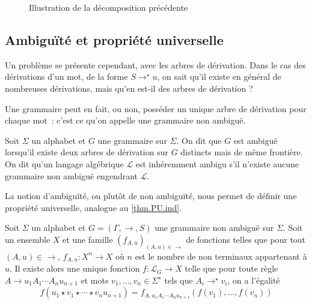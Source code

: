\begin{figure}[ht]
  \centering
  \caption{Illustration de la décomposition précédente}
\end{figure}

\subsection{Ambiguïté et propriété universelle}

Un problème se présente cependant, avec les arbres de dérivation. Dans le cas
des dérivations d'un mot, de la forme $S\to^\star u$, on sait qu'il existe en
général de nombreuses dérivations, mais qu'en est-il des arbres de dérivation ?

Une grammaire peut en fait, ou non, posséder un unique arbre de dérivation pour
chaque mot~: c'est ce qu'on appelle une grammaire non ambiguë.

\begin{definition}[Ambiguïté]
  Soit $\Sigma$ un alphabet et $G$ une grammaire sur $\Sigma$. On dit que $G$
  est ambiguë lorsqu'il existe deux arbres de dérivation sur $G$ distincts mais
  de même frontière. On dit qu'un langage algébrique $\mathcal L$ est
  inhéremment ambigu s'il n'existe aucune grammaire non ambiguë engendrant
  $\mathcal L$.
\end{definition}

La notion d'ambiguïté, ou plutôt de non ambiguïté, nous permet de définir une
propriété universelle, analogue au \cref{thm.PU.ind}.

\begin{proposition}
  \label{prop.PU.gram}
  Soit $\Sigma$ un alphabet et $G=(\Gamma,\to,S)$ une grammaire non ambiguë sur
  $\Sigma$. Soit un ensemble $X$ et une famille $(f_{A,u})_{(A,u) \in \to}$ de
  fonctions telles que pour tout $(A,u) \in \to$, $f_{A,u} : X^n \to X$ où $n$
  est le nombre de non terminaux appartenant à $u$. Il existe alors une unique
  fonction $f : \mathcal L_G \to X$ telle que pour toute règle
  $A \to u_1A_1\cdots A_nu_{n+1}$ et mots $v_1,\ldots,v_n\in\Sigma^\star$ tels que
  $A_i \to^\star v_i$, on a l'égalité
  \[f(u_1\star v_1\star\cdots\star v_n u_{n+1}) =
  f_{A,u_1A_1\cdots A_nu_{n+1}}(f(v_1),\ldots,f(v_n))\]
\end{proposition}

